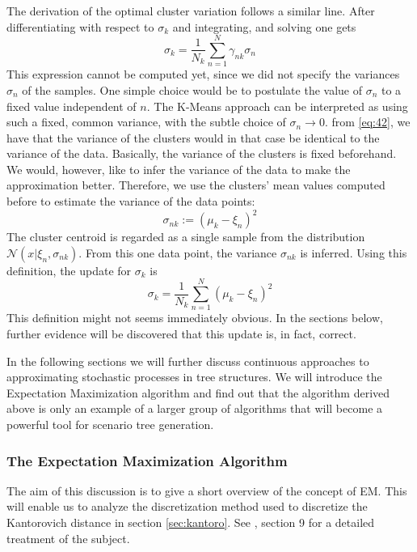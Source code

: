The derivation of the optimal cluster variation follows a similar line.
After differentiating with respect to $\sigma_k$ and integrating, and solving one gets
\begin{equation}
  \label{eq:42}
  \sigma_k = \frac{1}{N_k}\sum_{n=1}^N \gamma_{nk}\sigma_n
\end{equation}
This expression cannot be computed yet, since we did not specify the variances $\sigma_n$ of the samples.
One simple choice would be to postulate the value of $\sigma_n$ to a fixed value independent of $n$.
The K-Means approach can be interpreted as using such a fixed, common variance, with the subtle choice of $\sigma_n\rightarrow 0$.
from \eqref{eq:42}, we have that the variance of the clusters would in that case be identical to the variance of the data.
Basically, the variance of the clusters is fixed beforehand.
We would, however, like to infer the variance of the data to make the approximation better.
Therefore, we use the clusters' mean values computed before to estimate the variance of the data points:
\begin{equation}
  \label{eq:43}
  \sigma_{nk} := (\mu_k-\xi_n)^2
\end{equation}
The cluster centroid is regarded as a single sample from the distribution $\mathcal{N}(x|\xi_n, \sigma_{nk})$.
From this one data point, the variance $\sigma_{nk}$ is inferred.
Using this definition, the update for $\sigma_k$ is
\begin{equation}
  \label{eq:44}
  \sigma_k = \frac{1}{N_k}\sum_{n=1}^N (\mu_k-\xi_n)^2
\end{equation}
This definition might not seems immediately obvious.
In the sections below, further evidence will be discovered that this update is, in fact, correct.
%

In the following sections we will further discuss continuous approaches to approximating stochastic processes in tree structures.
We will introduce the Expectation Maximization algorithm and find out that the algorithm derived above is only an example of a larger group of algorithms that will become a powerful tool for scenario tree generation.
\subsubsection{The Expectation Maximization Algorithm}
The aim of this discussion is to give a short overview of the concept of EM.
This will enable us to analyze the discretization method used to discretize the Kantorovich distance in section \ref{sec:kantoro}.
See \cite{Bishop2006}, section 9 for a detailed treatment of the subject.

